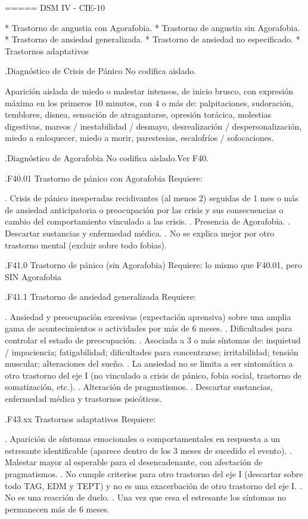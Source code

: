 \documentclass{scrbook}
\begin{document}
===== DSM IV - CIE-10

* Trastorno de angustia con Agorafobia.
* Trastorno de angustia sin Agorafobia.
* Trastorno de ansiedad generalizada.
* Trastorno de ansiedad no especificado.
* Trastornos adaptativos

.Diagnóstico de Crisis de Pánico
No codifica aislado.

Aparición aislada de miedo o malestar intensos, de inicio brusco, con expresión máxima en los primeros 10 minutos, con 4 o más de: palpitaciones, sudoración, temblores, disnea, sensación de atragantarse, opresión torácica, molestias digestivas, mareos / inestabilidad / desmayo, desrealización / despersonalización, miedo a enloquecer, miedo a morir, parestesias, escalofríos / sofocaciones.

.Diagnóstico de Agorafobia
No codifica aislado.Ver F40.

.F40.01 Trastorno de pánico con Agorafobia
Requiere:

. Crisis de pánico inesperadas recidivantes (al menos 2) seguidas de 1 mes o más de ansiedad anticipatoria o preocupación por las crisis y sus consecuencias o cambio del comportamiento vinculado a las crisis.
. Presencia de Agorafobia.
. Descartar sustancias y enfermedad médica.
. No se explica mejor por otro trastorno mental (excluir sobre todo fobias).

.F41.0 Trastorno de pánico (sin Agorafobia)
Requiere: lo mismo que F40.01, pero SIN Agorafobia

.F41.1 Trastorno de ansiedad generalizada
Requiere:

. Ansiedad y preocupación excesivas (expectación aprensiva) sobre una amplia gama de acontecimientos o actividades por más de 6 meses.
. Dificultades para controlar el estado de preocupación.
. Asociada a 3 o más síntomas de: inquietud / impaciencia; fatigabilidad; dificultades para concentrarse; irritabilidad; tensión muscular; alteraciones del sueño.
. La ansiedad no se limita a ser sintomática a otro trastorno del eje I (no vinculado a crisis de pánico, fobia social, trastorno de somatización, etc.).
. Alteración de pragmatismos.
. Descartar sustancias, enfermedad médica y trastornos psicóticos.

.F43.xx Trastornos adaptativos
Requiere:

. Aparición de síntomas emocionales o comportamentales en respuesta a un estresante identificable (aparece dentro de los 3 meses de sucedido el evento).
. Malestar mayor al esperable para el desencadenante, con afectación de pragmatismos.
. No cumple criterios para otro trastorno del eje I (descartar sobre todo TAG, EDM y TEPT) y no es una exacerbación de otro trastorno del eje I.
. No es una reacción de duelo.
. Una vez que cesa el estresante los síntomas no permanecen más de 6 meses.
\end{document}
